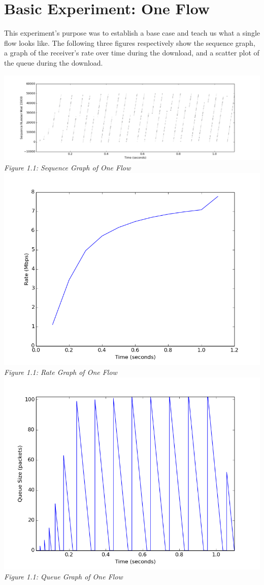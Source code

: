 \documentclass[11pt]{article}
\begin{document}
\section{Basic Experiment: One Flow}

This experiment's purpose was to establish a base case and teach us what a single flow looks like. The following three figures respectively show the sequence graph, a graph of the receiver's rate over time during the download, and a scatter plot of the queue during the download.

\includegraphics[width=17cm]{outputs/oneflow/converted_oneflow.txt_sequence.png}
\emph{Figure 1.1: Sequence Graph of One Flow}
\includegraphics[width=17cm]{outputs/oneflow/converted_oneflow.txt_rate.png}
\emph{Figure 1.1: Rate Graph of One Flow}
\includegraphics[width=17cm]{outputs/oneflow/converted_queue_oneflow.txt_queue.png}
\emph{Figure 1.1: Queue Graph of One Flow}
\end{document}
